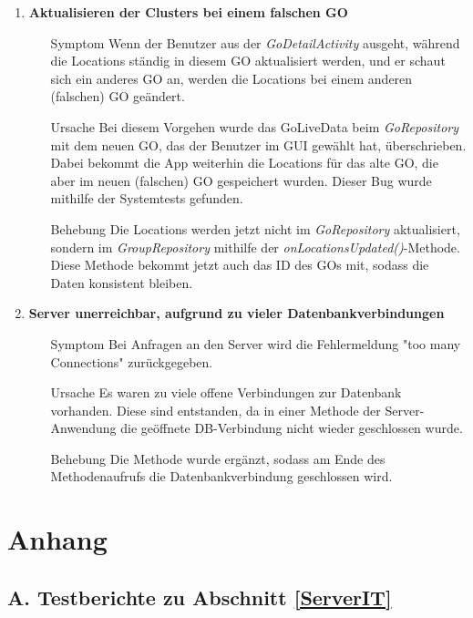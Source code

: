 \documentclass[11pt,a4paper]{scrartcl}
\def\threedigits#1{%
  \ifnum#1<100 0\fi
  \ifnum#1<10 0\fi
  \number#1}
\begin{document}
\begin{enumerate}[label={\textbf{/B\protect\threedigits{\theenumi}0/}}, leftmargin=*]
\item \textbf{Aktualisieren der Clusters bei einem falschen GO}
	\begin{itemize}
		\item[Symptom] Wenn der Benutzer aus der \textit{GoDetailActivity} ausgeht, während die Locations ständig in diesem GO aktualisiert werden, und er schaut sich ein anderes GO an, werden die Locations bei einem anderen (falschen) GO geändert.
		\item[Ursache] Bei diesem Vorgehen wurde das GoLiveData beim \textit{GoRepository} mit dem neuen GO, das der Benutzer im GUI gewählt hat, überschrieben. Dabei bekommt die App weiterhin die Locations für das alte GO, die aber im neuen (falschen) GO gespeichert wurden. Dieser Bug wurde mithilfe der Systemtests gefunden.
		\item[Behebung] Die Locations werden jetzt nicht im \textit{GoRepository} aktualisiert, sondern im \textit{GroupRepository} mithilfe der \textit{onLocationsUpdated()}-Methode. Diese Methode bekommt jetzt auch das ID des GOs mit, sodass die Daten konsistent bleiben.
	\end{itemize}
	
\item \textbf{Server unerreichbar, aufgrund zu vieler Datenbankverbindungen}
	\begin{itemize}
		\item[Symptom] Bei Anfragen an den Server wird die Fehlermeldung "too many Connections" zurückgegeben.
		\item[Ursache] Es waren zu viele offene Verbindungen zur Datenbank vorhanden. Diese sind entstanden, da in einer Methode der Server-Anwendung die geöffnete DB-Verbindung nicht wieder geschlossen wurde.
		\item[Behebung] Die Methode wurde ergänzt, sodass am Ende des Methodenaufrufs die Datenbankverbindung geschlossen wird.
	\end{itemize}

\end{enumerate}

\newpage

\section{Anhang}

\subsection{A. Testberichte zu Abschnitt \ref{ServerIT}}
\end{document}
